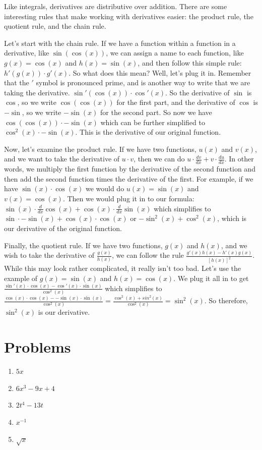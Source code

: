 \documentclass[12pt]{article}
\begin{document}
Like integrals, derivatives are distributive over addition. There are some interesting rules that make working with derivatives easier: the product rule, the quotient rule, and the chain rule. 

Let's start with the chain rule. If we have a function within a function in a derivative, like $\sin(\cos(x))$, we can assign a name to each function, like $g(x) = \cos(x)$ and $h(x) = \sin(x)$, and then follow this simple rule: $h'(g(x)) \cdot g'(x)$. So what does this mean? Well, let's plug it in. Remember that the $'$ symbol is pronounced prime, and is another way to write that we are taking the derivative. $\sin'(\cos(x)) \cdot \cos'(x)$. So the derivative of $\sin$ is $\cos$, so we write $\cos(\cos(x))$ for the first part, and the derivative of $\cos$ is $-\sin$, so we write $-\sin(x)$ for the second part. So now we have $\cos(\cos(x)) \cdot -\sin(x)$ which can be further simplified to $\cos^2(x) \cdot -\sin(x)$. This is the derivative of our original function.

Now, let's examine the product rule. If we have two functions, $u(x)$ and $v(x)$, and we want to take the derivative of $u\cdot v$, then we can do $u \cdot \frac{dv}{dx}+ v\cdot\frac{du}{dx}$. In other words, we multiply the first function by the derivative of the second function and then add the second function times the derivative of the first. For example, if we have $\sin(x)\cdot\cos(x)$ we would do $u(x) = \sin(x)$ and $v(x) = \cos(x)$. Then we would plug it in to our formula: $\sin(x)\cdot\frac{d}{dx}\cos(x) + \cos(x)\cdot\frac{d}{dx}\sin(x)$ which simplifies to $\sin\cdot -\sin(x) + \cos(x)\cdot\cos(x)$ or $-\sin^2(x)+\cos^2(x)$, which is our derivative of the original function.

Finally, the quotient rule. If we have two functions, $g(x)$ and $h(x)$, and we wish to take the derivative of $\frac{g(x)}{h(x)}$, we can follow the rule $\frac{g'(x)h(x)-h'(x)g(x)}{[h(x)]^2}$. While this may look rather complicated, it really isn't too bad. Let's use the example of $g(x) = \sin(x)$ and $h(x) = \cos(x)$. We plug it all in to get $\frac{\sin'(x)\cdot\cos(x) -\cos'(x)\cdot\sin(x)}{\cos^2(x)}$
which simplifies to $\frac{\cos(x)\cdot\cos(x)--\sin(x)\cdot\sin(x)}{\cos^2(x)} = \frac{\cos^2(x)+sin^2(x)}{\cos^2(x)} = \sin^2(x)$. So therefore, $\sin^2(x)$ is our derivative.
\section{Problems}
\begin{enumerate}
    \item $5x$
    \item $6x^3 - 9x + 4$
    \item $2t^4 - 13t$
    \item $x^{-1}$
    \item $\sqrt{x}$
\end{enumerate}
\end{document}
